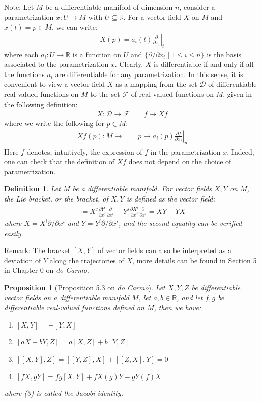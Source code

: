 \documentclass[11pt]{book}
\theoremstyle{break}
\theoremstyle{break}
\newtheorem{prop}[lem]{Proposition}
\newtheorem{defn}{Definition}[corL]
\newcommand{\R}{\mathbb{R}}
\newcommand{\pd}{\partial}
\newcommand{\note}{\color{red}Note: \color{black}}
\newcommand{\remark}{\color{blue}Remark: \color{black}}
\begin{document}
\note Let $M$ be a differentiable manifold of dimension $n$, consider a parametrization $x:U \to M$ with $U \subseteq \R$. For a vector field $X$ on $M$ and $x(t) = p \in M$, we can write:
\begin{align*}
X(p) = a_i(t) \left.\frac{\pd}{\pd x_i}\right|_{t}
\end{align*}
where each $a_i:U \to \R$ is a function on $U$ and $\{\pd/\pd x_i\mid 1\leq i \leq n\}$ is the basis associated to the parametrization $x$. Clearly, $X$ is differentiable if and only if all the functions $a_i$ are differentiable for any parametrization. In this sense, it is convenient to view a vector field $X$ as a mapping from the set $\mathcal{D}$ of differentiable real-valued functions on $M$ to the set $\mathcal{F}$ of real-valued functions on $M$, given in the following definition:
\begin{align*}
X:\mathcal{D} \to \mathcal{F} \qquad f\mapsto Xf
\end{align*}
where we write the following for $p \in M$:
\begin{align*}
Xf(p):M \to \qquad p\mapsto a_i(p) \left.\frac{\pd f}{\pd x_i}\right|_{p}
\end{align*}
Here $f$ denotes, intuitively, the expression of $f$ in the parametrization $x$. Indeed, one can check that the definition of $Xf$ does not depend on the choice of parametrization. \\


\begin{defn}
Let $M$ be a differentiable manifold. For vector fields $X,Y$ on $M$, the Lie bracket, or the bracket, of $X,Y$ is defined as the vector field:
\begin{align*}
[X,Y]\coloneqq X^j \frac{\pd Y^i}{\pd x^j} \frac{\pd}{\pd x^i} - Y^j \frac{\pd X^i}{\pd x^j}\frac{\pd}{\pd x^i} = XY - YX
\end{align*}
where $X = X^i \pd/\pd x^i$ and $Y = Y^i \pd/\pd x^i$, and the second equality can be verified easily.
\end{defn}
\remark The bracket $[X,Y]$ of vector fields can also be interpreted as a deviation of $Y$ along the trajectories of $X$, more details can be found in Section 5 in Chapter 0 on \textit{do Carmo}. 


\begin{prop}[Proposition 5.3 on \textit{do Carmo}]
Let $X,Y,Z$ be differentiable vector fields on a differentiable manifold $M$, let $a,b\in \R$, and let $f,g$ be differentiable real-valued functions defined on $M$, then we have:
\begin{enumerate}[topsep=3pt,itemsep=-1ex,partopsep=1ex,parsep=1ex]
\item $[X,Y ] = -[Y,X]$
\item $[aX + bY,Z] = a[X,Z] + b[Y,Z]$
\item $[[X,Y],Z] = [[Y,Z],X]+[[Z,X],Y]=0$
\item $[fX,gY] = fg[X,Y] +fX(g)Y - gY(f)X$
\end{enumerate} 
where (3) is called the Jacobi identity. 
\end{prop}
\end{document}
